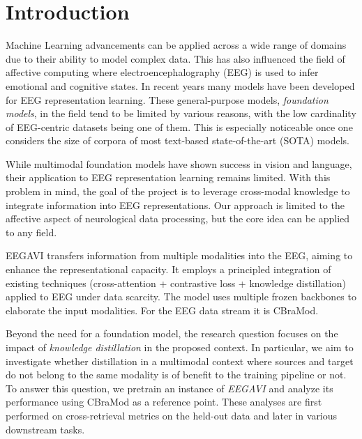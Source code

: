 

\section{Introduction}
Machine Learning advancements can be applied across a wide range of domains due to their ability to model complex data.
This has also influenced the field of affective computing where electroencephalography (EEG) is used to infer emotional and cognitive states.
In recent years many models have been developed for EEG representation learning.
These general-purpose models, \textit{foundation models}, in the field tend to be limited by various reasons, with the low cardinality of EEG-centric datasets being one of them.
This is especially noticeable once one considers the size of corpora of most text-based state-of-the-art (SOTA) models.

While multimodal foundation models have shown success in vision and language, their application to EEG representation learning remains limited.
With this problem in mind, the goal of the project is to leverage cross-modal knowledge to integrate information into EEG representations.
Our approach is limited to the affective aspect of neurological data processing, but the core idea can be applied to any field.

EEGAVI transfers information from multiple modalities into the EEG, aiming to enhance the representational capacity.
It employs a principled integration of existing techniques (cross-attention + contrastive loss + knowledge distillation) applied to EEG under data scarcity.
The model uses multiple frozen backbones to elaborate the input modalities.
For the EEG data stream it is CBraMod\cite{wang2025cbramodcrisscrossbrainfoundation}.

Beyond the need for a foundation model, the research question focuses on the impact of \textit{knowledge distillation} in the proposed context.
In particular, we aim to investigate whether distillation in a multimodal context where sources and target do not belong to the same modality is of benefit to the training pipeline or not.
To answer this question, we pretrain an instance of \textit{EEGAVI} and analyze its performance using CBraMod as a reference point.
These analyses are first performed on cross-retrieval metrics on the held-out data and later in various downstream tasks.
